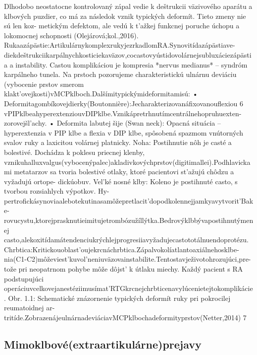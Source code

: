 Dlhodobo neostatocne kontrolovaný zápal vedie k deštrukcii väzivového aparátu a klbových puzdier, co má za následok vznik typických deformít. Tieto zmeny nie sú len koz- metickým defektom, ale vedú k t’ažkej funkcnej poruche úchopu a lokomocnej schopnosti (Olejárová;kol.,2016). Rukaazápästie:ArtikulárnykomplexrukyjezrkadlomRA.Synovitídazápästiave- diekdeštrukciikarpálnychkosticiekaväzov,cocastovyústidovolárnejsubluxáciezápästia a instability. Castou komplikáciou je kompresia *nervus medianus* -- syndróm karpálneho tunela. Na prstoch pozorujeme charakteristickú ulnárnu deviáciu (vybocenie prstov smerom klakt’ovejkosti)vMCPklboch.Dalšímitypickýmideformitamisú: • Deformitagombíkovejdierky(Boutonnière):Jecharakterizovanáfixovanouflexiou 6 vPIPklbeahyperextenziouvDIPklbe.Vznikápretrhnutímcentrálnehopruhuexten- zorovejšl’achy. • Deformita labutej šije (Swan neck): Opacná situácia -- hyperextenzia v PIP klbe a flexia v DIP klbe, spôsobená spazmom vnútorných svalov ruky a laxicitou volárnej platnicky. Noha: Postihnutie nôh je casté a bolestivé. Dochádza k poklesu priecnej klenby, vznikuhalluxvalgus(vybocenýpalec)akladivkovýchprstov(digitimallei).Podhlavickami metatarzov sa tvoria bolestivé otlaky, ktoré pacientovi st’ažujú chôdzu a vyžadujú ortope- dickúobuv. Vel’ké nosné klby: Koleno je postihnuté casto, s tvorbou rozsiahlych výpotkov. Hy- pertrofickásynoviaalebotekutinasamôžepretlacit’dopodkolennejjamkyavytvorit’Bake- rovucystu,ktorejprasknutieimitujetrombózužíllýtka.Bedrovýklbbývapostihnutýmenej casto,alekoxitídamátendenciukrýchlejprogresiiavyžadujecastototálnuendoprotézu. Chrbtica:Kritickouoblast’oujekrcnáchrbtica.Zápalvokolíatlantoaxiálnehosklbe- nia(C1-C2)môževiest’kuvol’neniuväzovainstabilite.Tentostavježivotohrozujúci,pre- tože pri neopatrnom pohybe môže dôjst’ k útlaku miechy. Každý pacient s RA podstupujúci operáciuvcelkovejanestéziimusímat’RTGkrcnejchrbticenavylúcenietejtokomplikácie. Obr. 1.1: Schematické znázornenie typických deformít ruky pri pokrocilej reumatoidnej ar- tritíde.ZobrazenájeulnárnadeviáciavMCPklbochadeformityprstov(Netter,2014) 7


\subsection{Mimoklbové(extraartikulárne)prejavy}

